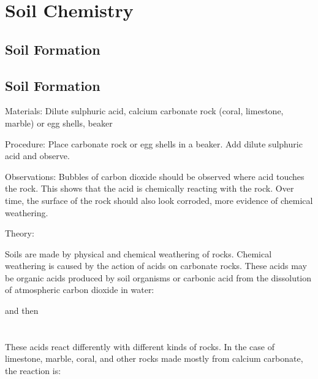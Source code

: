 \section{Soil Chemistry}  

\begin{multicols}{2}


\section*{Soil Formation}


\subsection{Soil Formation}


\begin{description*}
\item[Materials:]{Dilute sulphuric acid, calcium carbonate rock (coral, limestone, marble) or egg shells, beaker}
\item[Procedure:]{Place carbonate rock or egg shells in a beaker. Add dilute sulphuric acid and observe.}
\item[Observations:]{Bubbles of carbon dioxide should be observed where acid touches the rock. This shows that the acid is chemically reacting with the rock. Over time, the surface of the rock should also look corroded, more evidence of chemical weathering.}
\item[Theory:]{
\raggedright Soils are made by physical and chemical weathering of rocks. Chemical weathering is caused by the action of acids on carbonate rocks. These acids may be organic acids produced by soil organisms or carbonic acid from the dissolution of atmospheric carbon dioxide in water:\\
\begin{center}
\end{center}
and then\\
\vspace{6pt}
\\
\\
\vspace{6pt}
These acids react differently with different kinds of rocks. In the case of limestone, marble, coral, and other rocks made mostly from calcium carbonate, the reaction is:\\

}
\end{description*}
\end{multicols}
